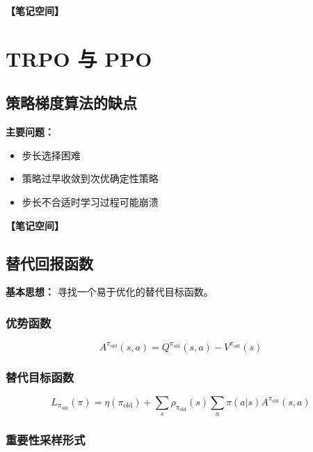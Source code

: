 \documentclass[12pt,a4paper]{article}
\newcommand{\notespace}[1][3cm]{%
  \vspace{#1}%
  \noindent\textbf{【笔记空间】}%
  \vspace{#1}%
}
\newcommand{\1}{\mathbf{1}}
\begin{document}
\notespace[3cm]

\newpage

\section{TRPO 与 PPO}

\subsection{策略梯度算法的缺点}

\begin{keybox}
\textbf{主要问题：}
\begin{itemize}[leftmargin=1.5em]
  \item 步长选择困难
  \item 策略过早收敛到次优确定性策略
  \item 步长不合适时学习过程可能崩溃
\end{itemize}
\end{keybox}

\notespace[2cm]

\subsection{替代回报函数}

\textbf{基本思想：} 寻找一个易于优化的替代目标函数。

\subsubsection*{优势函数}

\begin{equation}
A^{\pi_{\text{old}}}(s,a)=Q^{\pi_{\text{old}}}(s,a)-V^{\pi_{\text{old}}}(s)
\end{equation}

\subsubsection*{替代目标函数}

\begin{equation}
L_{\pi_{\text{old}}}(\pi)=\eta(\pi_{\text{old}})+\sum_s\rho_{\pi_{\text{old}}}(s)\sum_a\pi(a|s)A^{\pi_{\text{old}}}(s,a)
\end{equation}

\subsubsection*{重要性采样形式}
\end{document}
